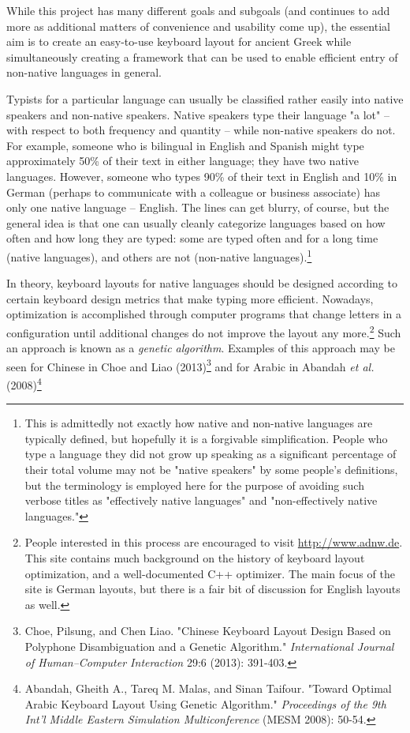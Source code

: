\documentclass[11pt]{article}
\begin{document}
While this project has many different goals and subgoals (and continues to add more as additional matters of convenience and usability come up), the essential aim is to create an easy-to-use keyboard layout for ancient Greek while simultaneously creating a framework that can be used to enable efficient entry of non-native languages in general.

Typists for a particular language can usually be classified rather easily into native speakers and non-native speakers. Native speakers type their language "a lot" -- with respect to both frequency and quantity -- while non-native speakers do not. For example, someone who is bilingual in English and Spanish might type approximately 50\% of their text in either language; they have two native languages. However, someone who types 90\% of their text in English and 10\% in German (perhaps to communicate with a colleague or business associate) has only one native language -- English. The lines can get blurry, of course, but the general idea is that one can usually cleanly categorize languages based on how often and how long they are typed: some are typed often and for a long time (native languages), and others are not (non-native languages).\footnote{This is admittedly not exactly how native and non-native languages are typically defined, but hopefully it is a forgivable simplification. People who type a language they did not grow up speaking as a significant percentage of their total volume may not be "native speakers" by some people's definitions, but the terminology is employed here for the purpose of avoiding such verbose titles as "effectively native languages" and "non-effectively native languages."}

In theory, keyboard layouts for native languages should be designed according to certain keyboard design metrics that make typing more efficient. Nowadays, optimization is accomplished through computer programs that change letters in a configuration until additional changes do not improve the layout any more.\footnote{People interested in this process are encouraged to visit \url{http://www.adnw.de}. This site contains much background on the history of keyboard layout optimization, and a well-documented C++ optimizer. The main focus of the site is German layouts, but there is a fair bit of discussion for English layouts as well.} Such an approach is known as a \emph{genetic algorithm}. Examples of this approach may be seen for Chinese in Choe and Liao (2013)\footnote{Choe, Pilsung, and Chen Liao. "Chinese Keyboard Layout Design Based on Polyphone Disambiguation and a Genetic Algorithm." \emph{International Journal of Human–Computer Interaction} 29:6 (2013): 391-403.} and for Arabic in Abandah \emph{et al.} (2008)\footnote{Abandah, Gheith A., Tareq M. Malas, and Sinan Taifour. "Toward Optimal Arabic Keyboard Layout Using Genetic Algorithm." \emph{Proceedings of the 9th Int’l Middle Eastern Simulation Multiconference} (MESM 2008): 50-54.}
\end{document}
